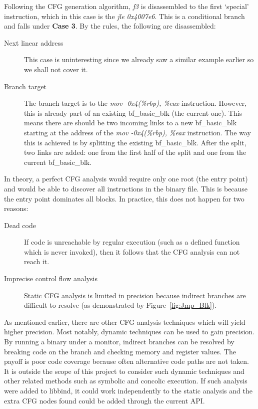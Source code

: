 Following the CFG generation algorithm, \emph{f3} is disassembled to the first `special' instruction, which in this case is the \emph{jle 0x4007e6}. This is a conditional branch and falls under \textbf{Case 3}. By the rules, the following are disassembled:

\begin{description}
\item [Next linear address] This case is uninteresting since we already saw a similar example earlier so we shall not cover it.
\item [Branch target] The branch target is to the \emph{mov -0x4(\%rbp), \%eax} instruction. However, this is already part of an existing bf\_basic\_blk (the current one). This means there are should be two incoming links to a new bf\_basic\_blk starting at the address of the \emph{mov -0x4(\%rbp), \%eax} instruction. The way this is achieved is by splitting the existing bf\_basic\_blk. After the split, two links are added: one from the first half of the split and one from the current bf\_basic\_blk.
\end{description}

In theory, a perfect CFG analysis would require only one root (the entry point) and would be able to discover all instructions in the binary file. This is because the entry point dominates all blocks. In practice, this does not happen for two reasons:

\begin{description}
\item [Dead code] If code is unreachable by regular execution (such as a defined function which is never invoked), then it follows that the CFG analysis can not reach it.
\item [Imprecise control flow analysis] Static CFG analysis is limited in precision because indirect branches are difficult to resolve (as demonstrated by Figure~\ref{fig:Jmp_Blk}).
\end{description}

As mentioned earlier, there are other CFG analysis techniques which will yield higher precision. Most notably, dynamic techniques can be used to gain precision. By running a binary under a monitor, indirect branches can be resolved by breaking code on the branch and checking memory and register values. The payoff is poor code coverage because often alternative code paths are not taken. It is outside the scope of this project to consider such dynamic techniques and other related methods such as symbolic and concolic execution\cite{coverage,concolic}. If such analysis were added to libbind, it could work independently to the static analysis and the extra CFG nodes found could be added through the current API.

